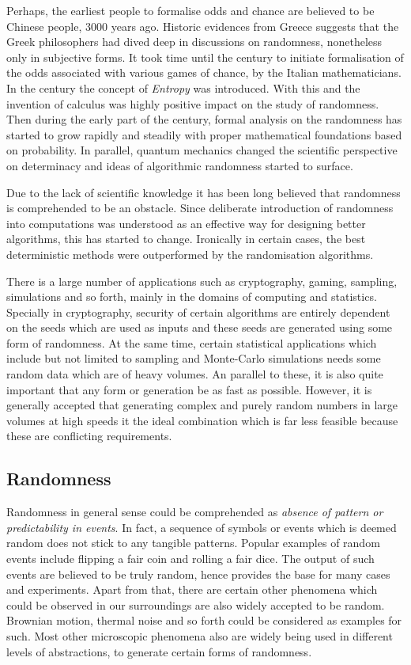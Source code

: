 Perhaps, the earliest people to formalise odds and chance are believed to be Chinese people, 3000 years ago. Historic evidences from Greece suggests that the Greek philosophers had dived deep in discussions on randomness, nonetheless only in subjective forms. It took time until the  century to initiate formalisation of the odds associated with various games of chance, by the Italian mathematicians. In the  century the concept of \textit{Entropy} was introduced. With this and the invention of calculus was highly positive impact on the study of randomness. Then during the early part of the  century, formal analysis on the randomness has started to grow rapidly and steadily with proper mathematical foundations based on probability. In parallel, quantum mechanics changed the scientific perspective on determinacy and ideas of algorithmic randomness started to surface.

Due to the lack of scientific knowledge it has been long believed that randomness is comprehended to be an obstacle. Since deliberate introduction of randomness into computations was understood as an effective way for designing better algorithms, this has started to change. Ironically in certain cases, the best deterministic methods were outperformed by the randomisation algorithms.

There is a large number of applications such as cryptography, gaming, sampling, simulations and so forth, mainly in the domains of computing and statistics. Specially in cryptography, security of certain algorithms are entirely dependent on the seeds which are used as inputs and these seeds are generated using some form of randomness. At the same time, certain statistical applications which include but not limited to sampling and Monte-Carlo simulations needs some random data which are of heavy volumes. An parallel to these, it is also quite important that any form or generation be as fast as possible. However, it is generally accepted that generating complex and purely random numbers in large volumes at high speeds it the ideal combination which is far less feasible because these are conflicting requirements.

\subsection{Randomness}

Randomness in general sense could be comprehended as \textit{absence of pattern or predictability in events}. In fact, a sequence of symbols or events which is deemed random does not stick to any tangible patterns. Popular examples of random events include flipping a fair coin and rolling a fair dice. The output of such events are believed to be truly random, hence provides the base for many cases and experiments. Apart from that, there are certain other phenomena which could be observed in our surroundings are also widely accepted to be random. Brownian motion, thermal noise and so forth could be considered as examples for such. Most other microscopic phenomena also are widely being used in different levels of abstractions, to generate certain forms of randomness. 


